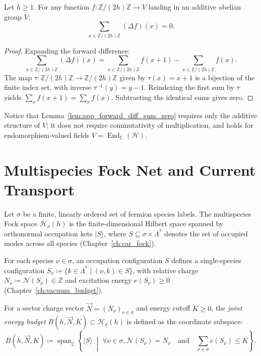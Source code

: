 \begin{lemma}
\label{lem:app_forward_diff_sum_zero}
Let $h \ge 1$. For any function $f : \mathbb{Z}/(2h)\mathbb{Z} \to V$ landing in an additive abelian group $V$:
\begin{equation}
\sum_{x \in \mathbb{Z}/(2h)\mathbb{Z}} (\Delta f)(x) = 0.
\end{equation}
\end{lemma}

\begin{proof}
Expanding the forward difference:
\[
\sum_{x \in \mathbb{Z}/(2h)\mathbb{Z}} (\Delta f)(x) = \sum_{x \in \mathbb{Z}/(2h)\mathbb{Z}} f(x + 1) - \sum_{x \in \mathbb{Z}/(2h)\mathbb{Z}} f(x).
\]
The map $\tau : \mathbb{Z}/(2h)\mathbb{Z} \to \mathbb{Z}/(2h)\mathbb{Z}$ given by $\tau(x) = x + 1$ is a bijection of the finite index set, with inverse $\tau^{-1}(y) = y - 1$. Reindexing the first sum by $\tau$ yields $\sum_x f(x+1) = \sum_x f(x)$. Subtracting the identical sums gives zero.
\end{proof}

Notice that Lemma~\ref{lem:app_forward_diff_sum_zero} requires only the additive structure of $V$; it does not require commutativity of multiplication, and holds for endomorphism-valued fields $V = \operatorname{End}_{\mathbb{C}}(\mathcal{H})$.

\section{Multispecies Fock Net and Current Transport}

Let $\sigma$ be a finite, linearly ordered set of fermion species labels. The multispecies Fock space $\mathcal{H}_\sigma(h)$ is the finite-dimensional Hilbert space spanned by orthonormal occupation kets $|S\rangle$, where $S \subseteq \sigma \times \Lambda^*$ denotes the set of occupied modes across all species (Chapter~\ref{ch:car_fock}).

For each species $\nu \in \sigma$, an occupation configuration $S$ defines a single-species configuration $S_\nu \coloneqq \{ k \in \Lambda^* \mid (\nu, k) \in S \}$, with relative charge $N_\nu \coloneqq \mathcal{N}(S_\nu) \in \mathbb{Z}$ and excitation energy $e(S_\nu) \ge 0$ (Chapter~\ref{ch:vacuum_budget}).

\begin{definition}
For a sector charge vector $\vec{N} = (N_\nu)_{\nu \in \sigma}$ and energy cutoff $K \ge 0$, the \emph{joint energy budget} $B(h, \vec{N}, K) \subset \mathcal{H}_\sigma(h)$ is defined as the coordinate subspace:
\begin{equation}
B(h, \vec{N}, K) \coloneqq \operatorname{span}_{\mathbb{C}} \left\{ |S\rangle \;\middle|\; \forall \nu \in \sigma, \mathcal{N}(S_\nu) = N_\nu \quad \text{and} \quad \sum_{\nu \in \sigma} e(S_\nu) \le K \right\}.
\end{equation}
\end{definition}

